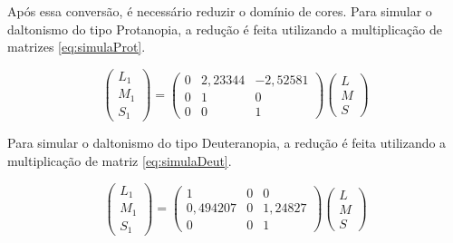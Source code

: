 \documentclass[	12pt, Times, openright, twoside, a4paper, english, brazil]{abntex2}
\begin{document}
Após essa conversão, é necessário reduzir o domínio de cores. Para simular o daltonismo do tipo Protanopia, a redução é feita utilizando a multiplicação de matrizes \ref{eq:simulaProt}.

\begin{equation}
\left(\begin{array}{ccc}
L_1\\M_1\\S_1
\end{array}\right)
=
\left(\begin{array}{ccc}
0 & 2,23344 & -2,52581 \\
0 & 1 & 0 \\
0 & 0 & 1
\end{array}\right)
\left(\begin{array}{ccc}
L\\M\\S
\end{array}\right)
\label{eq:simulaProt}
\end{equation}

Para simular o daltonismo do tipo Deuteranopia, a redução é feita utilizando a multiplicação de matriz \ref{eq:simulaDeut}.

\begin{equation}
\left(\begin{array}{ccc}
L_1\\M_1\\S_1
\end{array}\right)
=
\left(\begin{array}{ccc}
1 & 0 & 0 \\
0,494207 & 0 & 1,24827 \\
0 & 0 & 1
\end{array}\right)
\left(\begin{array}{ccc}
L\\M\\S
\end{array}\right)
\label{eq:simulaDeut}
\end{equation}
\end{document}
